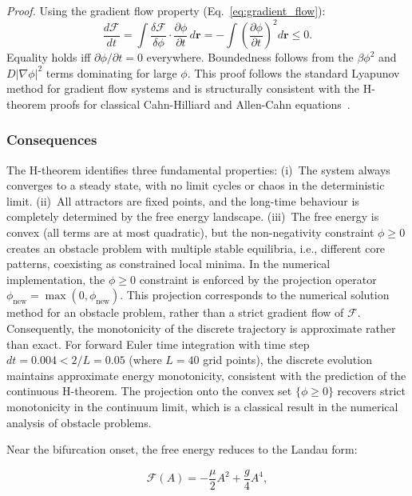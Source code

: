 \documentclass[sn-nature,pdflatex]{sn-jnl}
\begin{document}
\textit{Proof.}
Using the gradient flow property (Eq.~\ref{eq:gradient_flow}):
\begin{equation}
\frac{d\mathcal{F}}{dt} = \int \frac{\delta\mathcal{F}}{\delta\phi} \cdot \frac{\partial\phi}{\partial t} \, d\mathbf{r}
= -\int \left(\frac{\partial\phi}{\partial t}\right)^2 d\mathbf{r} \leq 0.
\end{equation}
Equality holds iff $\partial\phi/\partial t = 0$ everywhere.
Boundedness follows from the $\beta\phi^2$ and $D|\nabla\phi|^2$ terms dominating for large $\phi$.
This proof follows the standard Lyapunov method for gradient flow systems and is structurally consistent with the H-theorem proofs for classical Cahn-Hilliard and Allen-Cahn equations~\cite{chaikin_lubensky_1995}.

\subsubsection{Consequences}

The H-theorem identifies three fundamental properties:
(i)~The system always converges to a steady state, with no limit cycles or chaos in the deterministic limit.
(ii)~All attractors are fixed points, and the long-time behaviour is completely determined by the free energy landscape.
(iii)~The free energy is convex (all terms are at most quadratic), but the non-negativity constraint $\phi \geq 0$ creates an obstacle problem with multiple stable equilibria, i.e., different core patterns, coexisting as constrained local minima.
In the numerical implementation, the $\phi \geq 0$ constraint is enforced by the projection operator $\phi_{\text{new}} = \max(0, \phi_{\text{new}})$. This projection corresponds to the numerical solution method for an obstacle problem, rather than a strict gradient flow of $\mathcal{F}$. Consequently, the monotonicity of the discrete trajectory is approximate rather than exact. For forward Euler time integration with time step $dt = 0.004 < 2/L = 0.05$ (where $L = 40$ grid points), the discrete evolution maintains approximate energy monotonicity, consistent with the prediction of the continuous H-theorem. The projection onto the convex set $\{\phi \geq 0\}$ recovers strict monotonicity in the continuum limit, which is a classical result in the numerical analysis of obstacle problems.

Near the bifurcation onset, the free energy reduces to the Landau form:

\begin{equation}
\mathcal{F}(A) = -\frac{\mu}{2} A^2 + \frac{g}{4} A^4,
\end{equation}
\end{document}
